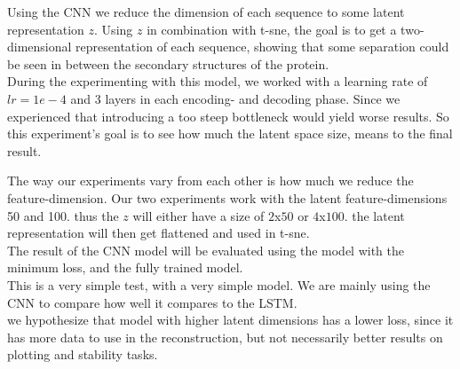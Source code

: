 Using the CNN we reduce the dimension of each sequence to some latent representation $z$. Using $z$ in combination with t-sne, the goal is to get a two-dimensional representation of each sequence, showing that some separation could be seen in between the secondary structures of the protein. \\

\noindent
During the experimenting with this model, we worked with a learning rate of $lr=1e-4$ and 3 layers in each encoding- and decoding phase. Since we experienced that introducing a too steep bottleneck would yield worse results. So this experiment's goal is to see how much the latent space size, means to the final result.

\noindent
The way our experiments vary from each other is how much we reduce the feature-dimension. Our two experiments work with the latent feature-dimensions 50 and 100. thus the $z$ will either have a size of $2$x$50$ or $4$x$100$. the latent representation will then get flattened and used in t-sne. \\

\noindent
The result of the CNN model will be evaluated using the model with the minimum loss, and the fully trained model. \\

\noindent
This is a very simple test, with a very simple model. We are mainly using the CNN to compare how well it compares to the LSTM. \\

\noindent
we hypothesize that model with higher latent dimensions has a lower loss, since it has more data to use in the reconstruction, but not necessarily better results on plotting and stability tasks.